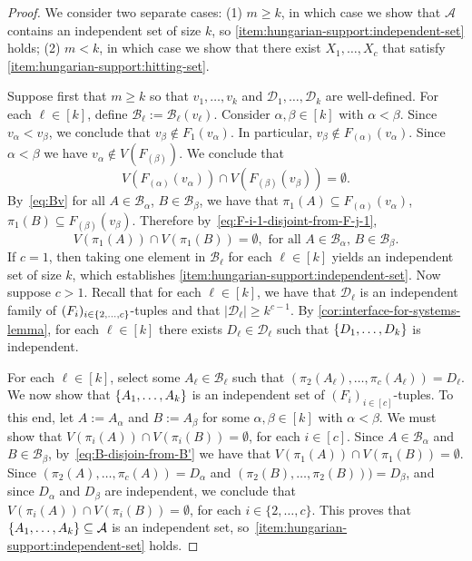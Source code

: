 \documentclass{patmorin}
\DeclarePairedDelimiter\set{\{}{\}}
\begin{document}
\begin{proof}
We consider two separate cases:
(1) $m\geq k$, in which case we show that $\mathcal{A}$ contains an independent set of size $k$, so \eqref{item:hungarian-support:independent-set} holds;
(2) $m<k$, in which case we show that there exist $X_1,\ldots,X_c$ that satisfy \eqref{item:hungarian-support:hitting-set}.

Suppose first that $m\geq k$ so that $v_1,\ldots,v_k$ and $\mathcal{D}_1,\ldots,\mathcal{D}_k$ are well-defined.  For each $\ell\in[k]$, define $\mathcal{B}_{\ell}:=\mathcal{B}_{\ell}(v_\ell)$. Consider $\alpha,\beta\in[k]$ with $\alpha<\beta$. Since $v_{\alpha} < v_{\beta}$, we conclude that $v_{\beta} \not\in F_1(v_{\alpha})$. In particular, $v_{\beta} \not\in F_{(\alpha)}(v_{\alpha})$. Since $\alpha<\beta$ we have $v_{\alpha}\not\in V(F_{(\beta)})$. We conclude that
\begin{equation}
  V(F_{(\alpha)}(v_{\alpha})) \cap V(F_{(\beta)}(v_{\beta})) = \emptyset.
  \label{eq:F-i-1-disjoint-from-F-j-1}
\end{equation}
By~\eqref{eq:Bv} for all $A\in \mathcal{B}_{\alpha}$, $B\in\mathcal{B}_{\beta}$, we have that
$\pi_1(A)\subseteq F_{(\alpha)}(v_{\alpha})$,  $\pi_1(B)\subseteq F_{(\beta)}(v_{\beta})$.
Therefore by~\eqref{eq:F-i-1-disjoint-from-F-j-1},
\begin{equation}
V(\pi_1(A)) \cap V(\pi_1(B))=\emptyset, \textrm{ for all $A\in\mathcal{B}_\alpha$, $B\in\mathcal{B}_\beta$.}
\label{eq:B-disjoin-from-B'}
\end{equation}
If $c=1$, then taking one element in $\mathcal{B}_\ell$ for each $\ell\in[k]$ yields an independent set of size $k$, which establishes \cref{item:hungarian-support:independent-set}.  Now suppose $c>1$.
Recall that for each $\ell\in[k]$,
we have that $\mathcal{D}_\ell$ is an independent family of
$(F_i)_{i\in\set{2,\ldots,c}}$-tuples and that
$|\mathcal{D}_{\ell}|\geq k^{c-1}$. 
By \cref{cor:interface-for-systems-lemma}, for each $\ell\in[k]$ there exists $D_\ell\in\mathcal{D}_\ell$ such that $\set{D_1,\ldots,D_k}$ is independent.

For each $\ell\in[k]$, select some $A_\ell\in\mathcal{B}_\ell$ such that $(\pi_2(A_\ell),\ldots,\pi_c(A_\ell))=D_\ell$.   We now show that $\set{A_1,\ldots,A_k}$ is an independent set of $(F_i)_{i\in[c]}$-tuples.
To this end, let $A:=A_\alpha$ and $B:=A_\beta$ for some $\alpha,\beta\in[k]$ with $\alpha < \beta$.  We must show that $V(\pi_i(A))\cap V(\pi_i(B))=\emptyset$, for each $i\in[c]$.
Since $A\in\mathcal{B}_{\alpha}$ and $B\in\mathcal{B}_{\beta}$, by~\eqref{eq:B-disjoin-from-B'} we have that $V(\pi_1(A))\cap V(\pi_1(B))=\emptyset$.
Since $(\pi_2(A),\ldots,\pi_c(A))=D_{\alpha}$ and $(\pi_2(B),\ldots,\pi_2(B)))=D_{\beta}$, and since $D_\alpha$ and $D_\beta$ are independent, we conclude that
$V(\pi_i(A)) \cap V(\pi_i(B))=\emptyset$, for each $i\in\{2,\ldots,c\}$.
This proves that $\set{A_1,\ldots,A_k}\subseteq\mathcal{A}$ is an independent set, so~\eqref{item:hungarian-support:independent-set} holds.


\end{proof}
\end{document}
